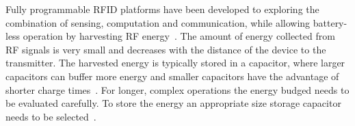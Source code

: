 \documentclass[letterpaper, 10 pt, conference]{ieeeconf}  %
\begin{document}
Fully programmable RFID platforms have been developed to exploring the combination of sensing, computation and communication, while allowing battery-less operation by harvesting RF energy~\cite{sample_transim_2008}.
The amount of energy collected from RF signals is very small and decreases with the distance of the device to the transmitter.
The harvested energy is typically stored in a capacitor, where larger capacitors can buffer more energy and smaller capacitors have the advantage of shorter charge times~\cite{gummerson_mobisys_2010}.
For longer, complex operations the energy budged needs to be evaluated carefully.
To store the energy an appropriate size storage capacitor needs to be selected~\cite{naderiparizi_rfid_2015}.





\end{document}
